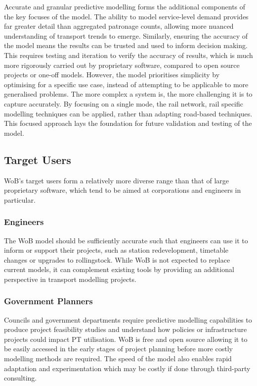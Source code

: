 Accurate and granular predictive modelling forms the additional components of the key focuses of the model. The ability to model service-level demand provides far greater detail than aggregated patronage counts, allowing more nuanced understanding of transport trends to emerge. Similarly, ensuring the accuracy of the model means the results can be trusted and used to inform decision making. This requires testing and iteration to verify the accuracy of results, which is much more rigorously carried out by proprietary software, compared to open source projects or one-off models. However, the model prioritises simplicity by optimising for a specific use case, instead of attempting to be applicable to more generalised problems. The more complex a system is, the more challenging it is to capture accurately. By focusing on a single mode, the rail network, rail specific modelling techniques can be applied, rather than adapting road-based techniques. This focused approach lays the foundation for future validation and testing of the model. 

\subsection{Target Users}
WoB's target users form a relatively more diverse range than that of large proprietary software, which tend to be aimed at corporations and engineers in particular. 

\subsubsection{Engineers}
The WoB model should be sufficiently accurate such that engineers can use it to inform or support their projects, such as station redevelopment, timetable changes or upgrades to rollingstock. While WoB is not expected to replace current models, it can complement existing tools by providing an additional perspective in transport modelling projects. 

\subsubsection{Government Planners}
Councils and government departments require predictive modelling capabilities to produce project feasibility studies and understand how policies or infrastructure projects could impact PT utilisation. WoB is free and open source allowing it to be easily accessed in the early stages of project planning before more costly modelling methods are required. The speed of the model also enables rapid adaptation and experimentation which may be costly if done through third-party consulting. 

